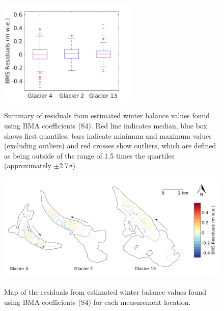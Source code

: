 \documentclass{sfuthesis}
\newcommand{\boxMatlab}{Red line indicates median, blue box shows first quantiles, bars indicate minimum and maximum values (excluding outliers) and red crosses show outliers, which are defined as being outside of the range of 1.5 times the quartiles (approximately $\pm2.7\sigma$). }
\begin{document}
\begin{figure}[H]
\centering
	\includegraphics[width =0.6\textwidth]{residuals_box_BMS.png}\\
\caption{Summary of residuals from estimated winter balance values found using BMA coefficients (S4). \boxMatlab}
\label{fig:BMAresidualsboxplot}
\end{figure} 

\begin{figure}[H]
	\centering
	\includegraphics[width =\textwidth]{residualsMap_BMS.png}\\
	\caption{Map of the residuals from estimated winter balance values found using BMA coefficients (S4) for each measurement location.}
	\label{fig:BMS_residualsMap}
\end{figure} 
\end{document}
